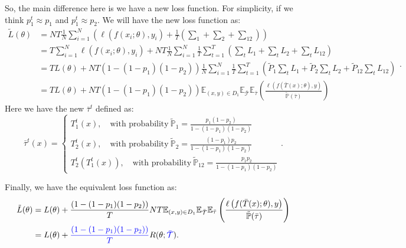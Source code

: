 So, the main difference here is we have a new loss function. For simplicity, if we think $p^t_1 \approx p_1$ and $p^t_1 \approx p_2$. 
We will have the new loss function as:
\begin{equation}\label{key}
\begin{aligned}
\tilde L(\theta) &=  NT \frac{1}{N}\sum_{i=1}^N \left(\ell(f(x_i;\theta),y_i) + \frac{1}{T}\left(\sum_1 + \sum_2 + \sum_{12}\right)  \right) \\
&= T\sum_{i=1}^N \ell(f(x_i;\theta),y_i)  +  NT \frac{1}{N} \sum_{i=1}^N  \frac{1}{T} \sum_{t=1}^T \left(\sum_tL_1 + \sum_tL_2 +  \sum_{t}L_{12}\right) \\
&=  T L(\theta) +NT(1-(1-p_1)(1-p_2)) \frac{1}{N} \sum_{i=1}^N  \frac{1}{T} \sum_{t=1}^T \left( \tilde P_1 \sum_tL_1 + \tilde P_2 \sum_tL_2 +\tilde P_{12} \sum_{t}L_{12}\right)  \\
&= T L(\theta) +NT(1-(1-p_1)(1-p_2)) \mathbb{E}_{(x,y) \in D_1} \mathbb{E}_{ \bar{\mathcal T}} \mathbb{E}_{\bar \tau} \left( \frac{\ell \left( f(\bar T(x);\theta), y\right)}{\tilde{\mathbb P}(\bar \tau)}  \right)
\end{aligned}.
\end{equation}
Here we have the new $\bar \tau^t$ defined as:
\begin{equation}\label{key}
\bar \tau^t(x) = \begin{cases}
T^t_1(x), \quad \text{with probability}~\tilde{\mathbb{ P}}_1 = \frac{p_1(1-p_2)}{1-(1-p_1)(1-p_2)} \\
T^t_2(x), \quad \text{with probability}~\tilde{\mathbb{ P}}_2 = \frac{(1-p_1)p_2}{1-(1-p_1)(1-p_2)}\\
T^t_2(T^t_1(x)), \quad \text{with probability}~ \tilde{\mathbb{ P}}_{12} = \frac{p_1p_2}{1-(1-p_1)(1-p_2)}
\end{cases}.
\end{equation}

Finally, we have the equivalent loss function as:
\begin{equation}\label{key}
\begin{aligned}
\tilde L(\theta) &= L(\theta) + \frac{(1-(1-p_1)(1-p_2))}{T} NT\mathbb{E}_{(x,y) \in D_1} \mathbb{E}_{ \bar{\mathcal T}} \mathbb{E}_{\bar \tau} \left( \frac{\ell \left( f(\bar T(x);\theta), y\right)}{\tilde{\mathbb P}(\bar \tau)}  \right) \\
&= L(\theta) + \textcolor{blue}{\frac{(1-(1-p_1)(1-p_2))}{T} } R(\theta; \textcolor{blue}{\bar{\mathcal T}}).
\end{aligned}
\end{equation}

